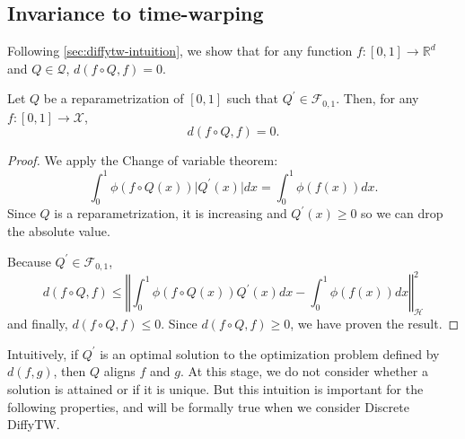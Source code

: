 \subsection{Invariance to time-warping}
Following \cref{sec:diffytw-intuition}, we show that for any function $f: [0,1] \to \mathbb R^d$ and $Q\in\mathcal Q$, $d(f\circ Q, f)=0$.
\begin{theorem}\label{thm:diffytw-invariance}
Let $Q$ be a reparametrization of $[0,1]$ such that $Q^\prime \in \mathcal F_{0, 1}$. Then, for any $f: [0,1] \to \mathcal X$,
\begin{equation}
    d(f\circ Q, f) = 0.
\end{equation}
\end{theorem}

\begin{proof}
We apply the Change of variable theorem\cite{ref}:
\begin{equation}
\int_0^1 \phi(f\circ Q(x))\vert Q^\prime(x)\vert dx = \int_0^1 \phi(f(x))dx.
\end{equation}
Since $Q$ is a reparametrization, it is increasing and $Q^\prime(x) \geq 0$ so we can drop the absolute value.

Because $Q^\prime \in \mathcal F_{0,1}$,
\begin{equation}
    d(f\circ Q, f) \leq \left \Vert \int_0^1 \phi(f\circ Q(x))Q^\prime(x)dx - \int_0^1 \phi(f(x))dx\right\Vert_\mathcal H^2
\end{equation}
and finally, $d(f\circ Q, f) \leq 0$. Since $d(f\circ Q, f) \geq 0$, we have proven the result.
\end{proof}

Intuitively, if $Q^\prime$ is an optimal solution to the optimization problem defined by $d(f, g)$, then $Q$ aligns $f$ and $g$. At this stage, we do not consider whether a solution is attained or if it is unique. But this intuition is important for the following properties, and will be formally true when we consider Discrete DiffyTW.

